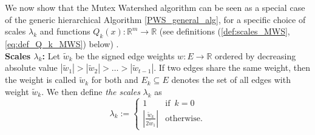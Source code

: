 


We now show that the Mutex Watershed algorithm can be seen as a special case of the generic hierarchical Algorithm \ref{PWS_general_alg}, for a specific choice of scales $\lambda_k$ and functions ${Q_k(x): \mathbb{R}^{m} \rightarrow \mathbb{R}}$ (see definitions (\ref{def:scales_MWS}, \ref{eq:def_Q_k_MWS}) below) . \\

\noindent \textbf{Scales $\lambda_k$:} Let $\tilde{w}_k$ be the signed edge weights $w: E \rightarrow \mathbb{R}$ ordered by decreasing absolute value $|\tilde{w}_1| > |\tilde{w}_2| > \ldots > |\tilde{w}_{t-1}|$. If two edges share the same weight, then the weight is called $\tilde{w}_k$ for both and $E_k \subseteq E$ denotes the set of all edges with weight $\tilde{w}_k$. We then define \textit{the scales} $\lambda_k$ as 
\begin{equation}
\lambda_k := 
\begin{cases}
1 & \text{if} \,\,\, k=0 \\
\left| \frac{\tilde{w}_k}{2\tilde{w}_1} \right| & \text{otherwise.}
\end{cases}\label{def:scales_MWS}
\end{equation}


